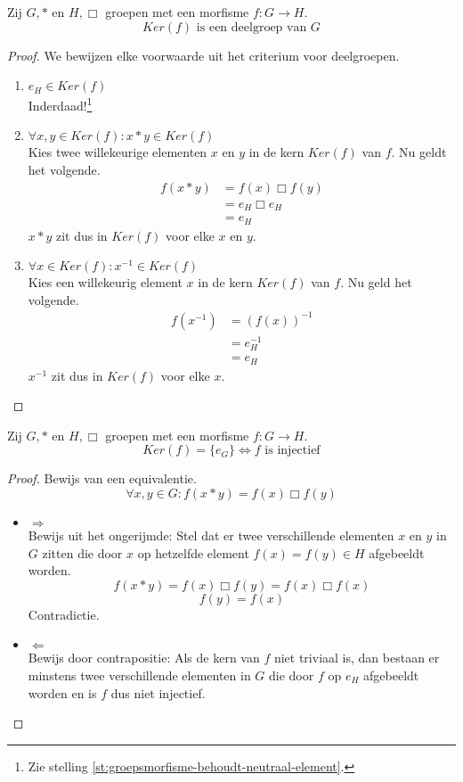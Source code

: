 \documentclass[main.tex]{subfiles}
\begin{document}
\begin{st}
  \label{st:kern-is-deelgroep}
  Zij $G,*$ en $H,\Box$ groepen met een morfisme $f: G \rightarrow H$.
  \[ Ker(f) \text{ is een deelgroep van } G \]
  \begin{proof}
    We bewijzen elke voorwaarde uit het criterium voor deelgroepen.
    \begin{enumerate}
    \item $e_{H} \in Ker(f)$\\
      Inderdaad!\footnote{Zie stelling \ref{st:groepsmorfisme-behoudt-neutraal-element}.}
    \item $\forall x,y \in Ker(f): x * y \in Ker (f)$\\
      Kies twee willekeurige elementen $x$ en $y$ in de kern $Ker(f)$ van $f$.
      Nu geldt het volgende.
      \[
      \begin{array}{rl}
      f(x * y) &= f(x) \Box f(y)\\
               &= e_{H} \Box e_{H}\\
               &= e_{H}
      \end{array}
      \]
      $x * y$ zit dus in $Ker (f)$ voor elke $x$ en $y$.
    \item $\forall x \in Ker(f): x^{-1} \in Ker (f)$\\
      Kies een willekeurig element $x$ in de kern $Ker(f)$ van $f$.
      Nu geld het volgende.
      \[
      \begin{array}{rl}
      f(x^{-1}) &= (f(x))^{-1}\\
               &= e_{H}^{-1}\\
               &= e_{H}
      \end{array}
      \]
      $x^{-1}$ zit dus in $Ker (f)$ voor elke $x$.
    \end{enumerate}
  \end{proof}
\end{st}

\begin{st}
  \label{st:kern-triviaal-asa-morfisme-injectief}
  Zij $G,*$ en $H,\Box$ groepen met een morfisme $f: G \rightarrow H$.
  \[ Ker(f) = \{e_{G}\}\Leftrightarrow f \text{ is injectief} \]

  \begin{proof}
    Bewijs van een equivalentie.
  \[ \forall x,y \in G: f(x*y) = f(x) \Box f(y) \]
    \begin{itemize}
    \item $\Rightarrow$\\
      Bewijs uit het ongerijmde: Stel dat er twee verschillende elementen $x$ en $y$ in $G$ zitten die door $x$ op hetzelfde element $f(x) = f(y) \in H$ afgebeeldt worden.
      \[ f(x*y) = f(x) \Box f(y) = f(x) \Box f(x) \]
      \[ f(y) = f(x) \]
      Contradictie.
    \item $\Leftarrow$\\
      Bewijs door contrapositie: Als de kern van $f$ niet triviaal is, dan bestaan er minstens twee verschillende elementen in $G$ die door $f$ op $e_{H}$ afgebeeldt worden en is $f$ dus niet injectief.
    \end{itemize}
  \end{proof}
\end{st}
\end{document}
